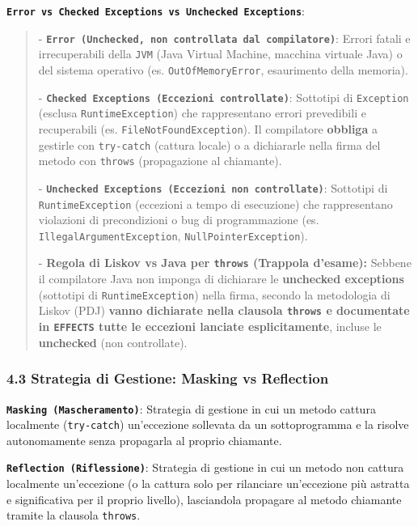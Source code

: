 \textbf{\texttt{Error vs Checked Exceptions vs Unchecked Exceptions}}:

\begin{quote}\small

- \textbf{\texttt{Error (Unchecked, non controllata dal compilatore)}}: Errori fatali e irrecuperabili della \texttt{JVM} (Java Virtual Machine, macchina virtuale Java) o del sistema operativo (es. \texttt{OutOfMemoryError}, esaurimento della memoria).

- \textbf{\texttt{Checked Exceptions (Eccezioni controllate)}}: Sottotipi di \texttt{Exception} (esclusa \texttt{RuntimeException}) che rappresentano errori prevedibili e recuperabili (es. \texttt{FileNotFoundException}). Il compilatore \textbf{obbliga} a gestirle con \texttt{try-catch} (cattura locale) o a dichiararle nella firma del metodo con \texttt{throws} (propagazione al chiamante).

- \textbf{\texttt{Unchecked Exceptions (Eccezioni non controllate)}}: Sottotipi di \texttt{RuntimeException} (eccezioni a tempo di esecuzione) che rappresentano violazioni di precondizioni o bug di programmazione (es. \texttt{IllegalArgumentException}, \texttt{NullPointerException}).

- \textbf{Regola di Liskov vs Java per \texttt{throws} (Trappola d'esame):} Sebbene il compilatore Java non imponga di dichiarare le \textbf{unchecked exceptions} (sottotipi di \texttt{RuntimeException}) nella firma, secondo la metodologia di Liskov (PDJ) \textbf{vanno dichiarate nella clausola \texttt{throws} e documentate in \texttt{EFFECTS} tutte le eccezioni lanciate esplicitamente}, incluse le \textbf{unchecked} (non controllate).

\end{quote}

\subsubsection{4.3 Strategia di Gestione: Masking vs Reflection}\label{4-3-strategia-di-gestione-masking-vs-reflection}

\textbf{\texttt{Masking (Mascheramento)}}: Strategia di gestione in cui un metodo cattura localmente (\texttt{try-catch}) un'eccezione sollevata da un sottoprogramma e la risolve autonomamente senza propagarla al proprio chiamante.

\textbf{\texttt{Reflection (Riflessione)}}: Strategia di gestione in cui un metodo non cattura localmente un'eccezione (o la cattura solo per rilanciare un'eccezione più astratta e significativa per il proprio livello), lasciandola propagare al metodo chiamante tramite la clausola \texttt{throws}.

